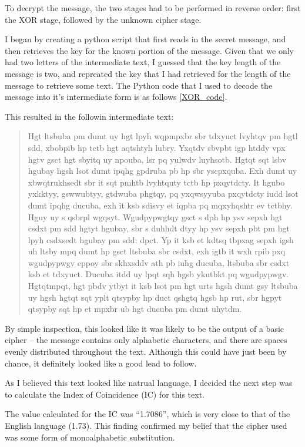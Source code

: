 \documentclass[11pt,a4paper,twoside]{article}
\begin{document}
To decrypt the message, the two stages had to be performed in reverse order:
first the XOR stage, followed by the unknown cipher stage. 

I began by creating a python script that first reads in the secret message, and
then retrieves the key for the known portion of the message. Given that we only
had two letters of the intermediate text, I guessed that the key length of the
message is two, and repreated the key that I had retrieved for the length of
the message to retrieve some text. The Python code that I used to decode the
message into it's intermediate form is as follows \ref{XOR_code}.


This resulted in the followin intermediate text: 

\begin{quote}
\small
\raggedright
Hgt ltsbuba pm dumt uy hgt lpyh wqpmpxbr sbr tdxyuct lvyhtqv pm hgtl sdd,
xbobpib hp tctb hgt aqtshtyh lubry.  Yxqtdv sbvpbt igp htddy vpx hgtv gsct hgt
sbyitq uy npouba, lsr pq yulwdv luyhsotb.  Hgtqt sqt lsbv hgubay hgsh lsot dumt
ipqhg gpdruba pb hp sbr yscpxquba. Exh dumt uy xbwqtrukhsedt sbr it sqt pmhtb
lvyhtquty tctb hp pxqytdcty.  It hgubo yxkktyy, gswwubtyy, gtdwuba phgtqy, pq
yxqwsyyuba pxqytdcty iudd lsot dumt ipqhg ducuba, exh it ksb sdisvy et iqpba pq
mqxyhqshtr ev tctbhy. Hguy uy s qsbrpl wgqsyt.  Wgudpypwgtqy gsct s dph hp ysv
sepxh hgt csdxt pm sdd hgtyt hgubay, sbr s duhhdt dtyy hp ysv sepxh pbt pm hgt
lpyh csdxsedt hgubay pm sdd: dpct. Yp it ksb et kdtsq tbpxag sepxh igsh uh
ltsby mpq dumt hp gsct ltsbuba sbr csdxt, exh igtb it wxh rpib pxq wgudpypwgv
eppoy sbr skhxsddv ath pb iuhg ducuba, ltsbuba sbr csdxt ksb et tdxyuct. Ducuba
itdd uy lpqt sqh hgsb ykutbkt pq wgudpypwgv.  Hgtqtmpqt,  hgt pbdv ytbyt it ksb
lsot pm hgt urts hgsh dumt gsy ltsbuba uy hgsh hgtqt sqt yplt qtsypby hp duct
qshgtq hgsb hp rut, sbr hgpyt qtsypby sqt hp et mpxbr ub hgt ducuba pm dumt
uhytdm.
\end{quote}

By simple inspection, this looked like it was likely to be the output of a
basic cipher -- the message contains only alphabetic characters, and there are
spaces evenly distributed throughout the text. Although this could have just
been by chance, it definitely looked like a good lead to follow.

As I believed this text looked like natrual language, I decided the next step was
to calculate the Index of Coincidence (IC) for this text. 

The value calculated for the IC was ``1.7086'', which is very close to that of
the English language (1.73). This finding confirmed my belief that the cipher
used was some form of monoalphabetic substitution.  
\end{document}
